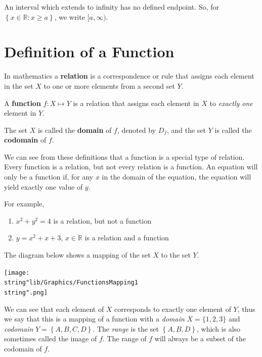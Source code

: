 \documentclass[11pt,a4paper]{book}
\newcommand{\R}{\mathbb{R}}
\begin{document}
An interval which extends to infinity has no defined endpoint. So,
for $\left\lbrace x\in\R:x\geq a\right\rbrace $, we write $[a,\infty)$.

\newpage

\section{Definition of a Function}
\begin{tcolorbox}[colback=blue!5, colframe=black,boxrule=.4pt, sharpish corners]

In mathematics a \textbf{relation }is a correspondence or rule that assigns each element in the set $X$ to one or more elements from a second set $Y$.

\medskip{}

A \textbf{function} $f:X\mapsto Y$ is a relation that assigns
each element in $X$ to\textit{ exactly one} element in $Y$.

\medskip{}

The set $X$ is called the \textbf{domain} of $f$, denoted by $D_{f}$, and
the set $Y$ is called the \textbf{codomain} of $f$.

\end{tcolorbox}

We can see from these definitions that a function is a special type of relation. Every function is a relation, but not every relation is a function. An equation will only be a function if, for any $x$ in the domain of the equation, the equation will yield exactly one value of $y$.

For example,

\begin{enumerate}[label=(\alph*)]

\item $x^{2}+y^{2}=4$ is a relation, but not a function

\item $y=x^{2}+x+3,\,x\in\R$ is a relation and a function

\end{enumerate}

The diagram below shows a mapping of the set $X$ to the set $Y$.
\begin{center}
\texttt{[image: \\string"lib/Graphics/FunctionsMapping1\\string".png]}
\par\end{center}

We can see that each element of $X$ corresponds to exactly one element of $Y$, thus we say that this is a mapping of a function with a \textit{domain} $X=\{1,2,3\}$ and \textit{codomain} $Y=\left\{ A,B,C,D\right\} $. The \textit{range} is the set $\left\{ A,B,D\right\} $, which is also sometimes called the image of $f$. The range of $f$ will always be a subset of the codomain of $f$.
\end{document}
